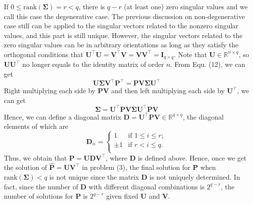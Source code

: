 \documentclass[titlepage,11pt,twoside]{article}
\begin{document}
If $0\le\text{rank}(\mathbf{\Sigma})=r< q$, there is $q-r$ (at least one) zero singular values and we call this case the degenerative case. The previous discussion on non-degenerative case still can be applied to the singular vectors related to the nonzero singular values, and this part is still unique. However, the singular vectors related to the zero singular values can be in arbitrary orientations as long as they satisfy the orthogonal conditions that $\mathbf{U}^{\top}\mathbf{U}=\mathbf{V}^{\top}\mathbf{V}=\mathbf{V}\mathbf{V}^{\top}=\mathbf{I}_{q\times q}$. Note that $\mathbf{U}\in \mathbb{R}^{n\times q}$, so $\mathbf{U}\mathbf{U}^{\top}$ no longer equals to the identity matrix of order $n$. From Equ. (12), we can get 
\begin{equation}
\mathbf{U}\mathbf{\Sigma}\mathbf{V}^{\top}\mathbf{P}^{\top}
=
\mathbf{P}\mathbf{V}\mathbf{\Sigma}\mathbf{U}^{\top}
\end{equation}
Right multiplying each side by $\mathbf{P}\mathbf{V}$ and then left multiplying each side by $\mathbf{U}^{\top}$, we can get  
\begin{equation}
\mathbf{\Sigma}
=
\mathbf{U}^{\top}\mathbf{P}\mathbf{V}\mathbf{\Sigma}\mathbf{U}^{\top}\mathbf{P}\mathbf{V}
\end{equation}
Hence, we can define a diagonal matrix $\mathbf{D}=\mathbf{U}^{\top}\mathbf{P}\mathbf{V}\in\mathbb{R}^{q\times q}$, the diagonal elements of which are 
\begin{displaymath}
\mathbf{D}_{ii}= \left\{ \begin{array}{ll}
1 & \textrm{if $1\le i\le r$};\\
\pm 1 & \textrm{if $r< i \le q$}.\\
\end{array} \right.
\end{displaymath}
Thus, we obtain that $\mathbf{P}=\mathbf{U}\mathbf{D}\mathbf{V}^{\top}$, where $\mathbf{D}$ is defined above. Hence, once we get the solution of $\mathbf{\hat{P}}=\mathbf{U}\mathbf{V}^{\top}$ in problem (3), the final solution for $\mathbf{P}$ when $\text{rank}(\mathbf{\Sigma})<q$ is not unique since the matrix $\mathbf{D}$ is not uniquely determined. In fact, since the number of $\mathbf{D}$ with different diagonal combinations is $2^{q-r}$, the number of solutions for $\mathbf{P}$ is $2^{q-r}$ given fixed $\mathbf{U}$ and $\mathbf{V}$.

\end{document}
